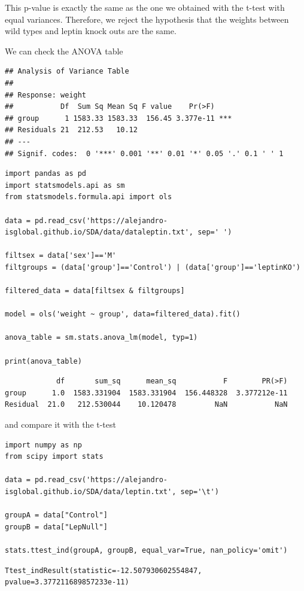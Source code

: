 \documentclass[
]{book}
\begin{document}
This p-value is exactly the same as the one we obtained with the t-test with equal variances. Therefore, we reject the hypothesis that the weights between wild types and leptin knock outs are the same.

We can check the ANOVA table

\begin{verbatim}
## Analysis of Variance Table
## 
## Response: weight
##           Df  Sum Sq Mean Sq F value    Pr(>F)    
## group      1 1583.33 1583.33  156.45 3.377e-11 ***
## Residuals 21  212.53   10.12                      
## ---
## Signif. codes:  0 '***' 0.001 '**' 0.01 '*' 0.05 '.' 0.1 ' ' 1
\end{verbatim}

\begin{verbatim}
import pandas as pd
import statsmodels.api as sm
from statsmodels.formula.api import ols

data = pd.read_csv('https://alejandro-isglobal.github.io/SDA/data/dataleptin.txt', sep=' ')

filtsex = data['sex']=='M'
filtgroups = (data['group']=='Control') | (data['group']=='leptinKO')

filtered_data = data[filtsex & filtgroups]

model = ols('weight ~ group', data=filtered_data).fit()

anova_table = sm.stats.anova_lm(model, typ=1)

print(anova_table)
\end{verbatim}

\begin{verbatim}
            df       sum_sq      mean_sq           F        PR(>F)
group      1.0  1583.331904  1583.331904  156.448328  3.377212e-11
Residual  21.0   212.530044    10.120478         NaN           NaN
\end{verbatim}

and compare it with the t-test

\begin{verbatim}
import numpy as np
from scipy import stats

data = pd.read_csv('https://alejandro-isglobal.github.io/SDA/data/leptin.txt', sep='\t')

groupA = data["Control"]
groupB = data["LepNull"]

stats.ttest_ind(groupA, groupB, equal_var=True, nan_policy='omit')
\end{verbatim}

\begin{verbatim}
Ttest_indResult(statistic=-12.507930602554847, pvalue=3.377211689857233e-11)
\end{verbatim}
\end{document}
